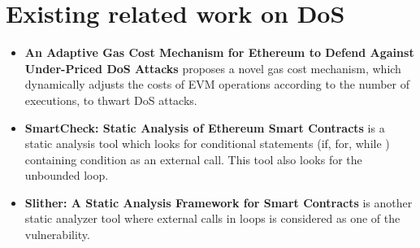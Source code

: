 \section{Existing related work on DoS}
\begin{itemize}
    \item \textbf{An Adaptive Gas Cost Mechanism for Ethereum to Defend Against Under-Priced DoS Attacks\cite{10.1007/978-3-319-72359-4_1}} proposes a novel gas cost mechanism, which dynamically adjusts the costs of EVM operations according to the number of executions, to thwart DoS attacks. 
    \item \textbf{SmartCheck: Static Analysis of Ethereum Smart Contracts\cite{8445052}} is a static analysis tool\cite{sctool}\cite{scgithub} which looks for conditional statements (if, for, while ) containing condition as an external call. This tool also looks for the unbounded loop.
    \item \textbf{Slither: A Static Analysis Framework for Smart Contracts\cite{8823898}} is another static analyzer tool\cite{slgithub} where external calls in loops is considered as one of the vulnerability. 

\end{itemize}
